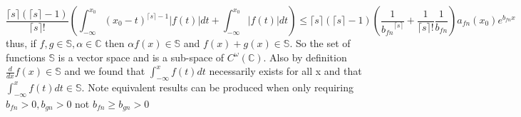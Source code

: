 \documentclass[%
 onecolumn,
 amsmath, amssymb, aps, pra, 10pt
]{revtex4-2}
\begin{document}
\[ \frac{\lceil s \rceil(\lceil s \rceil - 1)}{\lceil s \rceil!} \left(\int_{-\infty}^{x_0} (x_0 - t)^{\lceil s \rceil -1} \left|f(t)\right|dt + \int_{-\infty}^{x_0} \left|f(t)\right|dt\right) \leq \lceil s \rceil(\lceil s \rceil - 1)\left(\frac{1}{{b_{fn}}^{\lceil s \rceil}} + \frac{1}{\lceil s \rceil!}\frac{1}{b_{fn}}\right)a_{fn}(x_0)e^{b_{fn}x}\]
thus, if $f, g \in \mathbb{S}, \alpha \in \mathbb{C}$ then $\alpha f(x) \in \mathbb{S}$ and $f(x) + g(x) \in \mathbb{S}$. So the set of functions $\mathbb{S}$ is a vector space and is a sub-space of $C^\omega(\mathbb{C})$. Also by definition $\frac{d}{dx}f(x) \in \mathbb{S}$ and we found that $\int_{-\infty}^x f(t)dt$ necessarily exists for all x and that $\int_{-\infty}^x f(t)dt \in \mathbb{S}$. Note equivalent results can be produced when only requiring $b_{fn}>0, b_{gn}>0$ not $b_{fn}\geq b_{gn} > 0$



\end{document}
